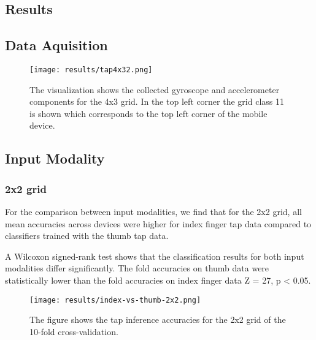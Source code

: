
\begin{appendix}

\section*{Results}
\subsection*{Data Aquisition}

\begin{figure}[h!]
  \centering
  \texttt{[image: results/tap4x32.png]}
  \caption{The visualization shows the collected gyroscope and accelerometer components for the 4x3 grid. In the top left corner the grid class 11 is shown which corresponds to the top left corner of the mobile device.} \label{fig:taps}
\end{figure}

\subsection*{Input Modality}
\subsubsection*{2x2 grid}
For the comparison between input modalities, we find that for the 2x2 grid, all mean accuracies across devices were higher for index finger tap data compared to classifiers trained with the thumb tap data.

A Wilcoxon signed-rank test shows that the classification results for both input modalities differ significantly. The fold accuracies on thumb data were statistically lower than the fold accuracies on index finger data Z = 27, p < 0.05.

\begin{figure}[h!]
  \centering
  \texttt{[image: results/index-vs-thumb-2x2.png]}
  \caption{The figure shows the tap inference accuracies for the 2x2 grid of the 10-fold cross-validation.} \label{fig:participation}
\end{figure}


\end{appendix}
